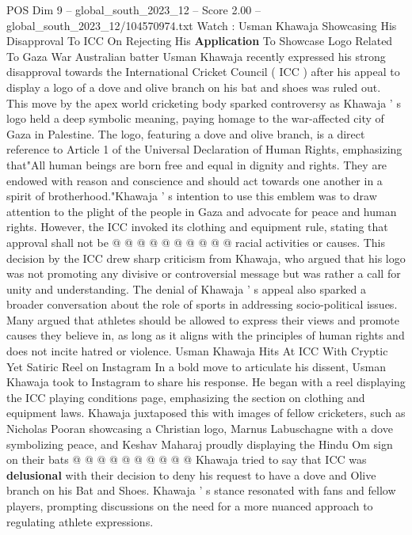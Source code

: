 \begin{textsample}{POS Dim 9 – global\_south\_2023\_12 – Score 2.00 – global\_south\_2023\_12/104570974.txt}  \label{ex:f9_pos_143}
Watch : Usman Khawaja Showcasing His Disapproval To ICC On Rejecting His \textbf{Application} To Showcase Logo Related To Gaza War Australian batter Usman Khawaja recently expressed his strong disapproval towards the International Cricket Council ( ICC ) after his appeal to display a logo of a dove and olive branch on his bat and shoes was ruled out.
This move by the apex world cricketing body sparked controversy as Khawaja ' s logo held a deep symbolic meaning, paying homage to the war-affected city of Gaza in Palestine.
The logo, featuring a dove and olive branch, is a direct reference to Article 1 of the Universal Declaration of Human Rights, emphasizing that"All human beings are born free and equal in dignity and rights.
They are endowed with reason and conscience and should act towards one another in a spirit of brotherhood."Khawaja ' s intention to use this emblem was to draw attention to the plight of the people in Gaza and advocate for peace and human rights.
However, the ICC invoked its clothing and equipment rule, stating that approval shall not be @ @ @ @ @ @ @ @ @ @ racial activities or causes.
This decision by the ICC drew sharp criticism from Khawaja, who argued that his logo was not promoting any divisive or controversial message but was rather a call for unity and understanding.
The denial of Khawaja ' s appeal also sparked a broader conversation about the role of sports in addressing socio-political issues.
Many argued that athletes should be allowed to express their views and promote causes they believe in, as long as it aligns with the principles of human rights and does not incite hatred or violence.
Usman Khawaja Hits At ICC With Cryptic Yet Satiric Reel on Instagram In a bold move to articulate his dissent, Usman Khawaja took to Instagram to share his response.
He began with a reel displaying the ICC playing conditions page, emphasizing the section on clothing and equipment laws.
Khawaja juxtaposed this with images of fellow cricketers, such as Nicholas Pooran showcasing a Christian logo, Marnus Labuschagne with a dove symbolizing peace, and Keshav Maharaj proudly displaying the Hindu Om sign on their bats @ @ @ @ @ @ @ @ @ @ Khawaja tried to say that ICC was \textbf{delusional} with their decision to deny his request to have a dove and Olive branch on his Bat and Shoes.
Khawaja ' s stance resonated with fans and fellow players, prompting discussions on the need for a more nuanced approach to regulating athlete expressions.

\end{textsample}
